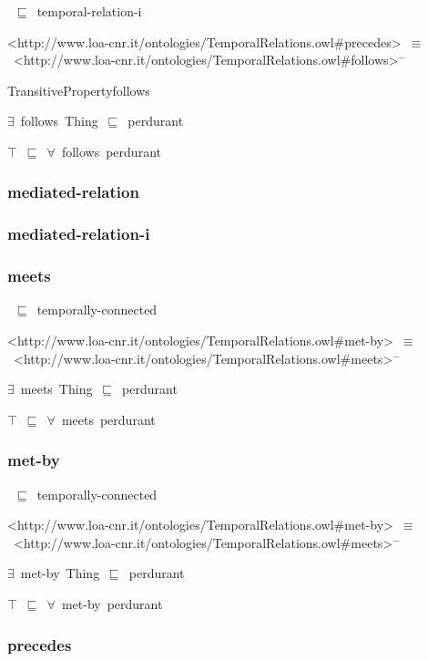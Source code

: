 \documentclass{article}
\begin{document}
~\ensuremath{\sqsubseteq}~temporal-relation-i

<http://www.loa-cnr.it/ontologies/TemporalRelations.owl#precedes>~\ensuremath{\equiv}~<http://www.loa-cnr.it/ontologies/TemporalRelations.owl#follows>\ensuremath{^-}

TransitivePropertyfollows

\ensuremath{\exists}~follows~Thing~\ensuremath{\sqsubseteq}~perdurant

\ensuremath{\top}~\ensuremath{\sqsubseteq}~\ensuremath{\forall}~follows~perdurant

\subsubsection*{mediated-relation}

\subsubsection*{mediated-relation-i}

\subsubsection*{meets}

~\ensuremath{\sqsubseteq}~temporally-connected

<http://www.loa-cnr.it/ontologies/TemporalRelations.owl#met-by>~\ensuremath{\equiv}~<http://www.loa-cnr.it/ontologies/TemporalRelations.owl#meets>\ensuremath{^-}

\ensuremath{\exists}~meets~Thing~\ensuremath{\sqsubseteq}~perdurant

\ensuremath{\top}~\ensuremath{\sqsubseteq}~\ensuremath{\forall}~meets~perdurant

\subsubsection*{met-by}

~\ensuremath{\sqsubseteq}~temporally-connected

<http://www.loa-cnr.it/ontologies/TemporalRelations.owl#met-by>~\ensuremath{\equiv}~<http://www.loa-cnr.it/ontologies/TemporalRelations.owl#meets>\ensuremath{^-}

\ensuremath{\exists}~met-by~Thing~\ensuremath{\sqsubseteq}~perdurant

\ensuremath{\top}~\ensuremath{\sqsubseteq}~\ensuremath{\forall}~met-by~perdurant

\subsubsection*{precedes}
\end{document}
